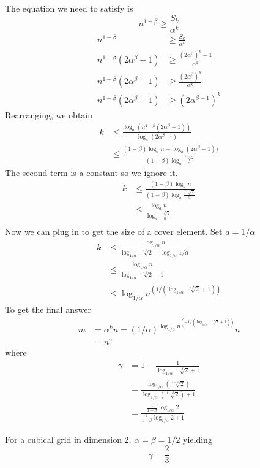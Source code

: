 \documentclass{amsart}
\begin{document}
The equation we need to satisfy is
$$ n^{1-\beta} \geq \frac{S_k}{\alpha^k}$$
\begin{align*}
	n^{1-\beta} &\geq \frac{S_k}{\alpha^k}\\
	n^{1-\beta}(2\alpha^\beta-1)& \geq  \frac{(2\alpha^\beta)^k -1 }{\alpha^k}\\
	n^{1-\beta}(2\alpha^\beta-1)& \geq  \frac{(2\alpha^\beta)^k }{\alpha^k}\\
	n^{1-\beta}(2\alpha^\beta-1)& \geq  (2\alpha^{\beta-1})^k 
\end{align*}
Rearranging, we obtain
\begin{align*}
	k &\leq \frac{\log_a (n^{1-\beta}(2\alpha^\beta-1))}{\log_a (2\alpha^{\beta-1}) } \\
	&\leq \frac{(1-\beta)\log_a n + \log_a (2\alpha^\beta-1))}{(1-\beta)\log_a \frac{\sqrt[1-\beta]{2}}{\alpha }}
\end{align*}
The second term is a constant so we ignore it. 
\begin{align*}
	k&\leq  \frac{(1-\beta)\log_a n } {(1-\beta)\log_a \frac{\sqrt[1-\beta]{2}}{\alpha }}\\
	&\leq \frac{\log_a n }{\log_a \frac{\sqrt[1-\beta]{2}}{\alpha }}\\
\end{align*}
Now we can plug in to get the size of a cover element. Set $a=1/\alpha$
\begin{align*}
	k&\leq \frac{\log_{1/\alpha} n }{\log_{1/\alpha} \sqrt[1-\beta]{2} +\log_{1/\alpha} 1/\alpha }\\
	&\leq \frac{\log_{1/\alpha} n }{\log_{1/\alpha} \sqrt[1-\beta]{2} + 1}\\
	& \leq \log_{1/\alpha} n^{(1/(\log_{1/\alpha} \sqrt[1-\beta]{2} + 1))} 
\end{align*}
To get the final answer
\begin{align*}
	m & = \alpha^k n  = (1/\alpha)^{\log_{1/\alpha} n^{(-1/(\log_{1/\alpha} \sqrt[1-\beta]{2} + 1))} } n\\ 
	& = n^\gamma
\end{align*}
where
\begin{align*}
	\gamma & = 1 -\frac{1}{\log_{1/\alpha} \sqrt[1-\beta]{2} + 1}\\
	&=\frac{\log_{1/\alpha} (\sqrt[1-\beta]{2} ) }{\log_{1/\alpha} (\sqrt[1-\beta]{2} ) + 1}\\
	&=\frac{\frac{1}{1-\beta}\log_{1/\alpha} 2}{\frac{1}{1-\beta}\log_{1/\alpha} 2  + 1}
\end{align*}


For a cubical grid in dimension 2, $\alpha=\beta =1/2$
yielding
$$ \gamma = \frac{2}{3} $$
\end{document}

